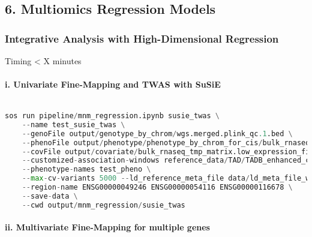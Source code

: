 \documentclass[12pt]{article}
\begin{document}
\subsection*{6. Multiomics Regression Models}


\subsubsection*{Integrative Analysis with High-Dimensional Regression}
Timing < X minutes

\paragraph*{i. Univariate Fine-Mapping and TWAS with SuSiE}


\noindent
\begin{lstlisting}[language=Python]

sos run pipeline/mnm_regression.ipynb susie_twas \
    --name test_susie_twas \
    --genoFile output/genotype_by_chrom/wgs.merged.plink_qc.1.bed \
    --phenoFile output/phenotype/phenotype_by_chrom_for_cis/bulk_rnaseq.phenotype_by_chrom_files.region_list.txt \
    --covFile output/covariate/bulk_rnaseq_tmp_matrix.low_expression_filtered.outlier_removed.tmm.expression.covariates.wgs.merged.plink_qc.plink_qc.prune.pca.Marchenko_PC.gz \
    --customized-association-windows reference_data/TAD/TADB_enhanced_cis.bed \
    --phenotype-names test_pheno \
    --max-cv-variants 5000 --ld_reference_meta_file data/ld_meta_file_with_bim.tsv \
    --region-name ENSG00000049246 ENSG00000054116 ENSG00000116678 \
    --save-data \
    --cwd output/mnm_regression/susie_twas

\end{lstlisting}




\paragraph*{ii. Multivariate Fine-Mapping for multiple genes}
\end{document}
